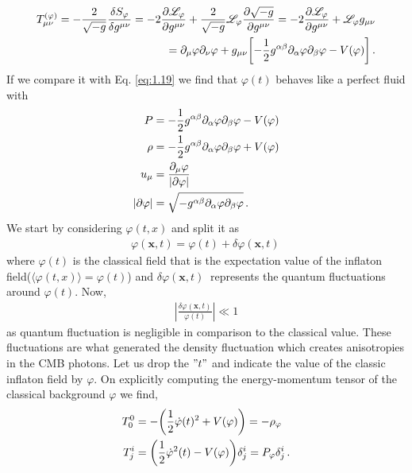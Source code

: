 \begin{align}
    T_{\mu \nu }^{(\varphi )} = - \frac{2}{\sqrt{-g}} \fdv{S_{\varphi }}{g^{\mu \nu }} =- 2 \frac{\partial\mathscr{L}_\varphi }{\partial g^{\mu \nu }} + \frac{2}{\sqrt{-g}} \mathscr{L}_\varphi \pdv{\sqrt{-g}}{g^{\mu \nu }} = - 2 \pdv{\mathscr{L}_\varphi }{g^{\mu \nu }} + \mathscr{L}_\varphi g_{\mu \nu }\\ = \partial_{\mu } \varphi \partial_{\nu } \varphi + g_{\mu \nu } \qty[- \frac{1}{2} g^{\alpha \beta } \partial_{\alpha } \varphi \partial_{\beta} \varphi - V(\varphi )] \,. \label{1.2.18}
\end{align}
If we compare it with Eq. \eqref{eq:1.19} we find that $\varphi(t)$ behaves like a perfect fluid with
\begin{align}
    P &= -\frac{1}{2} g^{\alpha \beta }\partial_{\alpha } \varphi \partial_{\beta} \varphi - V(\varphi ) \label{1.2.19} \\
    \rho &= - \frac{1}{2} g^{\alpha \beta }\partial_{\alpha } \varphi \partial_{\beta} \varphi  + V(\varphi )  \label{1.2.20} \\
    u_\mu &= \frac{\partial_{\mu}\varphi}{\abs{\partial \varphi }}  \\
    \abs{\partial \varphi} &= \sqrt{- g^{\alpha \beta }\partial_{\alpha } \varphi \partial_{\beta} \varphi}
    \,.
\end{align}
\hspace{0.5cm}We start by considering $\varphi(t,x)$ and split it as
\begin{align}
    \varphi (\mathbf{x}, t) = \varphi(t) + \delta \varphi (\mathbf{x}, t) \, \label{1.2.23}
\end{align}
where $\varphi(t)$ is the classical field that is the expectation value of the inflaton field(\(\langle \varphi(t,x) \rangle = \varphi(t)\)) and $\delta \varphi(\mathbf{x}, t)\ $ represents the quantum fluctuations around $\varphi(t)$.
Now, 
\begin{align}
    \left|\frac{\delta \varphi(\mathbf{x}, t)}{\varphi(t)} \right| \ll 1 \label{1.2.24}
\end{align}
as quantum fluctuation is negligible in comparison to the classical value. These fluctuations are what generated the density fluctuation which creates anisotropies in the CMB photons. Let us drop the $"t"$ and indicate the value of the classic inflaton field by $\varphi$. On explicitly computing the energy-momentum tensor of the classical background $\varphi$ we find,
\begin{align}
    T^{0}_{0} &= - \qty( \frac{1}{2} \dot{\varphi}(t)^2 + V(\varphi )) = - \rho_\varphi\label{1.2.25}\\
    T^{i}_{j} &= \qty( \frac{1}{2} \dot{\varphi}^2 (t) - V(\varphi)) \delta^{i}_{j} = P_\varphi \delta^{i}_{j}\,. \label{1.2.26}
\end{align}
